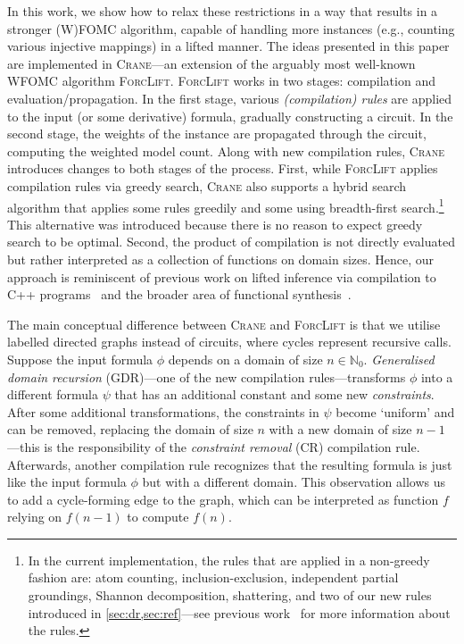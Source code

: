 \documentclass{article}
\theoremstyle{definition}
\theoremstyle{remark}
\begin{document}
In this work, we show how to relax these restrictions in a way that results in a
stronger (W)FOMC algorithm, capable of handling more instances (e.g., counting
various injective mappings) in a lifted manner. The ideas presented in this
paper are implemented in \textsc{Crane}---an extension of the arguably most
well-known WFOMC algorithm \textsc{ForcLift}. \textsc{ForcLift} works in two
stages: compilation and evaluation/propagation. In the first stage, various
\emph{(compilation) rules} are applied to the input (or some derivative)
formula, gradually constructing a circuit. In the second stage, the weights of
the instance are propagated through the circuit, computing the weighted model
count. Along with new compilation rules, \textsc{Crane} introduces changes to
both stages of the process. First, while \textsc{ForcLift} applies compilation
rules via greedy search, \textsc{Crane} also supports a hybrid search algorithm
that applies some rules greedily and some using breadth-first
search.\footnote{In the current implementation, the rules that are applied in a
  non-greedy fashion are: atom counting, inclusion-exclusion, independent
  partial groundings, Shannon decomposition, shattering, and two of our new
  rules introduced in \cref{sec:dr,sec:ref}---see previous
  work~\cite{DBLP:conf/ijcai/BroeckTMDR11} for more information about the
  rules.} This alternative was introduced because there is no reason to expect
greedy search to be optimal. Second, the product of compilation is not directly
evaluated but rather interpreted as a collection of functions on domain sizes.
Hence, our approach is reminiscent of previous work on lifted inference via
compilation to C++ programs~\cite{DBLP:conf/kr/KazemiP16} and the broader area
of functional
synthesis~\cite{DBLP:conf/cav/GoliaRM20,DBLP:conf/pldi/KuncakMPS10,sanathanan1963transfer}.


The main conceptual difference between \textsc{Crane} and \textsc{ForcLift} is
that we utilise labelled directed graphs instead of circuits, where cycles
represent recursive calls. Suppose the input formula $\phi$ depends on a domain
of size $n \in \mathbb{N}_{0}$. \emph{Generalised domain recursion} (GDR)---one
of the new compilation rules---transforms $\phi$ into a different formula $\psi$
that has an additional constant and some new \emph{constraints}. After some
additional transformations, the constraints in $\psi$ become `uniform' and can
be removed, replacing the domain of size $n$ with a new domain of size
$n-1$---this is the responsibility of the \emph{constraint removal} (CR)
compilation rule. Afterwards, another compilation rule recognizes that the
resulting formula is just like the input formula $\phi$ but with a different
domain. This observation allows us to add a cycle-forming edge to the graph,
which can be interpreted as function $f$ relying on $f(n-1)$ to compute $f(n)$.
\end{document}
